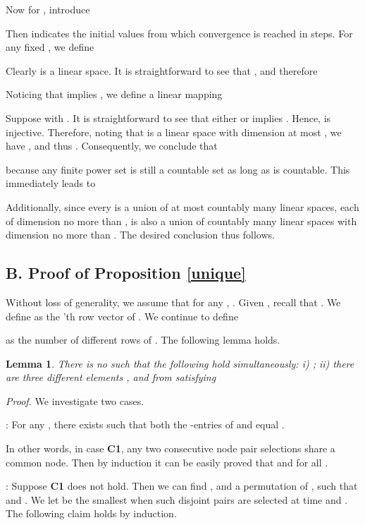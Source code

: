 \documentclass[a4paper, 11pt]{article}
\newtheorem{lemma}{Lemma}
\begin{document}
 Now  for , introduce

Then  indicates the initial values  from which convergence is reached in  steps. For any fixed , we define

 Clearly  is a linear space. It is straightforward to see that , and therefore
 

Noticing that  implies , we define a linear mapping

 Suppose  with . It is straightforward to see that either  or  implies . Hence,  is  injective. Therefore, noting that  is a linear space with dimension at most , we have , and thus . Consequently, we conclude that

because any finite power set   is still a countable set as long as  is countable. This immediately leads to


Additionally, since every  is a union of at most countably many linear spaces, each of dimension no more than ,  is also a union of countably many linear spaces with dimension no more than . The desired conclusion thus follows.



\subsection*{B. Proof of Proposition \ref{unique}}
Without loss of generality, we assume that for any , . Given , recall that . We define   as the 'th row vector of . We continue to define

as the number of different rows of . The following lemma holds.
\begin{lemma}\label{no3points}
There is no  such that  the following hold simultaneously: i) ; ii) there are three different elements ,  and  from  satisfying

\end{lemma}
{\it Proof.} We investigate two cases.

\medskip

: For any , there exists  such that both the -entries of  and  equal .

In other words, in case {\bf C1}, any two consecutive node pair selections share a common node. Then  by induction it can be easily proved  that   and  for all .

\medskip

: Suppose {\bf C1} does not hold. Then we can find , and a permutation  of , such that  and . We let  be the smallest  when such disjoint pairs are selected at time  and . The following claim holds by induction.
\end{document}

